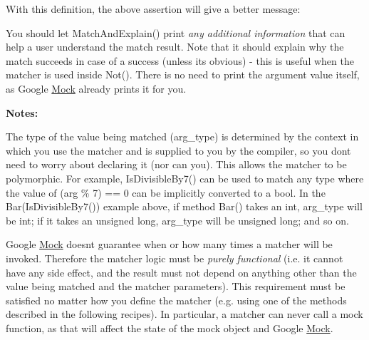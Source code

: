 With this definition, the above assertion will give a better message\+: 
\begin{DoxyCode}{0}
\end{DoxyCode}


You should let {\ttfamily Match\+And\+Explain()} print {\itshape any additional information} that can help a user understand the match result. Note that it should explain why the match succeeds in case of a success (unless it\textquotesingle{}s obvious) -\/ this is useful when the matcher is used inside {\ttfamily Not()}. There is no need to print the argument value itself, as Google \mbox{\hyperlink{class_mock}{Mock}} already prints it for you.

{\bfseries{Notes\+:}}


\begin{DoxyEnumerate}
\item The type of the value being matched ({\ttfamily arg\+\_\+type}) is determined by the context in which you use the matcher and is supplied to you by the compiler, so you don\textquotesingle{}t need to worry about declaring it (nor can you). This allows the matcher to be polymorphic. For example, {\ttfamily Is\+Divisible\+By7()} can be used to match any type where the value of {\ttfamily (arg \% 7) == 0} can be implicitly converted to a {\ttfamily bool}. In the {\ttfamily Bar(\+Is\+Divisible\+By7())} example above, if method {\ttfamily Bar()} takes an {\ttfamily int}, {\ttfamily arg\+\_\+type} will be {\ttfamily int}; if it takes an {\ttfamily unsigned long}, {\ttfamily arg\+\_\+type} will be {\ttfamily unsigned long}; and so on.
\end{DoxyEnumerate}
\begin{DoxyEnumerate}
\item Google \mbox{\hyperlink{class_mock}{Mock}} doesn\textquotesingle{}t guarantee when or how many times a matcher will be invoked. Therefore the matcher logic must be {\itshape purely functional} (i.\+e. it cannot have any side effect, and the result must not depend on anything other than the value being matched and the matcher parameters). This requirement must be satisfied no matter how you define the matcher (e.\+g. using one of the methods described in the following recipes). In particular, a matcher can never call a mock function, as that will affect the state of the mock object and Google \mbox{\hyperlink{class_mock}{Mock}}.
\end{DoxyEnumerate}

